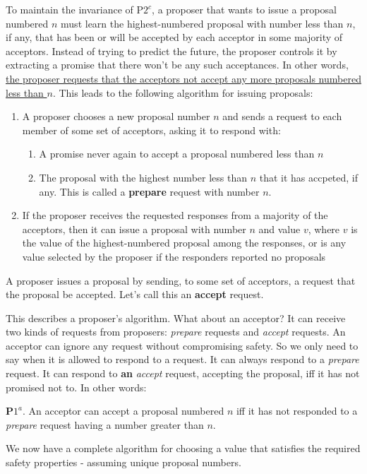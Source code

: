 \documentclass[11pt]{article}
\begin{document}
To maintain the invariance of P\(2^c\), a proposer that wants to issue a proposal numbered \(n\) must
learn the highest-numbered proposal with number less than \(n\), if any, that has been or will be
accepted by each acceptor in some majority of acceptors. Instead of trying to predict the future, the
proposer controls it by extracting a promise that there won't be any such acceptances. In other words,
\uline{the proposer requests that the acceptors not accept any more proposals numbered less than \(n\)}. This
leads to the following algorithm for issuing proposals:
\begin{enumerate}
\item A proposer chooses a new proposal number \(n\) and sends a request to each member of some set of
acceptors, asking it to respond with:
\begin{enumerate}
\item A promise never again to accept a proposal numbered less than \(n\)
\item The proposal with the highest number less than \(n\) that it has accpeted, if any.
This is called a \textbf{prepare} request with number \(n\).
\end{enumerate}
\item If the proposer receives the requested responses from a majority of the acceptors, then it can
issue a proposal with number \(n\) and value \(v\), where \(v\) is the value of the
highest-numbered proposal among the responses, or is any value selected by the proposer if the
responders reported no proposals
\end{enumerate}


A proposer issues a proposal by sending, to some set of acceptors, a request that the proposal be
accepted. Let's call this an \textbf{accept} request.

This describes a proposer's algorithm. What about an acceptor? It can receive two kinds of requests
from proposers: \emph{prepare} requests and \emph{accept} requests. An acceptor can ignore any request without
compromising safety. So we only need to say when it is allowed to respond to a request. It can always
respond to a \emph{prepare} request. It can respond to \textbf{an} \emph{accept} request, accepting the proposal, iff it has
not promised not to. In other words:

\textbf{P\(1^a\)}. An acceptor can accept a proposal numbered \(n\) iff it has not responded to a \emph{prepare}
request having a number greater than \(n\).

We now have a complete algorithm for choosing a value that satisfies the required safety properties -
assuming unique proposal numbers.
\end{document}
